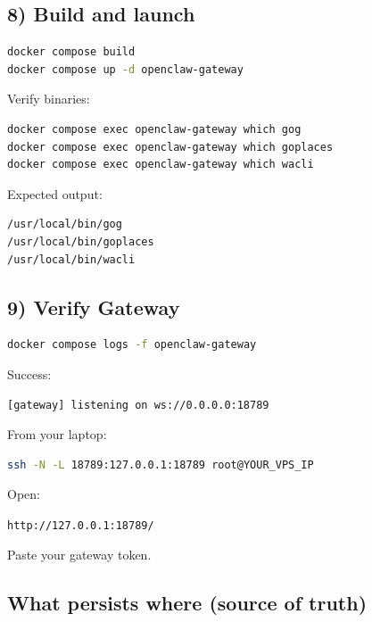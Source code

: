 \hrulefill


\subsection{8) Build and launch}


\begin{lstlisting}[language=bash]
docker compose build
docker compose up -d openclaw-gateway
\end{lstlisting}


Verify binaries:

\begin{lstlisting}[language=bash]
docker compose exec openclaw-gateway which gog
docker compose exec openclaw-gateway which goplaces
docker compose exec openclaw-gateway which wacli
\end{lstlisting}


Expected output:

\begin{lstlisting}
/usr/local/bin/gog
/usr/local/bin/goplaces
/usr/local/bin/wacli
\end{lstlisting}


\hrulefill


\subsection{9) Verify Gateway}


\begin{lstlisting}[language=bash]
docker compose logs -f openclaw-gateway
\end{lstlisting}


Success:

\begin{lstlisting}
[gateway] listening on ws://0.0.0.0:18789
\end{lstlisting}


From your laptop:

\begin{lstlisting}[language=bash]
ssh -N -L 18789:127.0.0.1:18789 root@YOUR_VPS_IP
\end{lstlisting}


Open:

\texttt{http://127.0.0.1:18789/}

Paste your gateway token.

\hrulefill


\subsection{What persists where (source of truth)}


